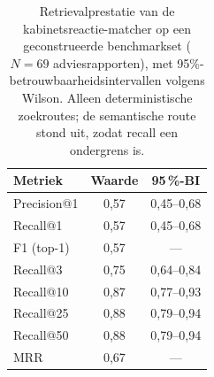 \begin{table}[htbp]
\centering
\caption{Retrievalprestatie van de kabinetsreactie-matcher op een geconstrueerde
benchmarkset ($N = 69$ adviesrapporten), met 95\%-betrouwbaarheidsintervallen
volgens Wilson. Alleen deterministische zoekroutes; de semantische route stond
uit, zodat recall een ondergrens is.}
\label{tab:dv1-retrieval}
\footnotesize
\begin{tabular}{@{}lcc@{}}
\toprule
Metriek & Waarde & 95\,\%-BI \\
\midrule
Precision@1 & 0,57 & 0,45--0,68 \\
Recall@1    & 0,57 & 0,45--0,68 \\
F1 (top-1)  & 0,57 & --- \\
Recall@3    & 0,75 & 0,64--0,84 \\
Recall@10   & 0,87 & 0,77--0,93 \\
Recall@25   & 0,88 & 0,79--0,94 \\
Recall@50   & 0,88 & 0,79--0,94 \\
MRR         & 0,67 & --- \\
\bottomrule
\end{tabular}
\end{table}
